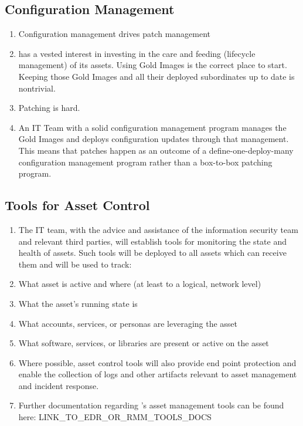 \documentclass[../main.tex]{subfiles}
\begin{document}
\subsection{Configuration Management}
\begin{enumerate}
    \item Configuration management drives patch management
    \item \CompanyName{} has a vested interest in investing in the care and feeding (lifecycle management) of its assets. Using Gold Images is the correct place to start.
    Keeping those Gold Images and all their deployed subordinates up to date is nontrivial.
    \item Patching is hard.
    \item An IT Team with a solid configuration management program manages the Gold Images and deploys configuration updates through that management. This means that patches happen as an outcome
    of a define-one-deploy-many configuration management program rather than a box-to-box patching program.
\end{enumerate}
\subsection{Tools for Asset Control}
\begin{enumerate}
    \item The IT team, with the advice and assistance of the information security team and relevant third parties, will establish tools for monitoring the state and health of assets.
    Such tools will be deployed to all \CompanyName{} assets which can receive them and will be used to track:
    \item What asset is active and where (at least to a logical, network level)
    \item What the asset's running state is
    \item What accounts, services, or personas are leveraging the asset
    \item What software, services, or libraries are present or active on the asset
    \item Where possible, asset control tools will also provide end point protection and enable the collection of logs and other artifacts relevant to asset management and incident response.
    \item Further documentation regarding \CompanyName's asset management tools can be found here: LINK\_TO\_EDR\_OR\_RMM\_TOOLS\_DOCS
\end{enumerate}
\end{document}
